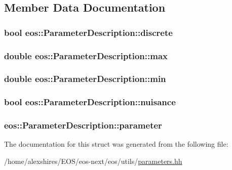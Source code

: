 \subsection{Member Data Documentation}
\hypertarget{structeos_1_1ParameterDescription_a3f62f41ab537a373291807e3b2445c08}{
\subsubsection[{discrete}]{\setlength{\rightskip}{0pt plus 5cm}bool {\bf eos::ParameterDescription::discrete}}}
\label{structeos_1_1ParameterDescription_a3f62f41ab537a373291807e3b2445c08}
\hypertarget{structeos_1_1ParameterDescription_a4375b5ec8b9d496a6183d08f92dc648b}{
\subsubsection[{max}]{\setlength{\rightskip}{0pt plus 5cm}double {\bf eos::ParameterDescription::max}}}
\label{structeos_1_1ParameterDescription_a4375b5ec8b9d496a6183d08f92dc648b}
\hypertarget{structeos_1_1ParameterDescription_abab49c1ed74185718b6d696938d94683}{
\subsubsection[{min}]{\setlength{\rightskip}{0pt plus 5cm}double {\bf eos::ParameterDescription::min}}}
\label{structeos_1_1ParameterDescription_abab49c1ed74185718b6d696938d94683}
\hypertarget{structeos_1_1ParameterDescription_ac9e90def0fd26f7f4f9f59df93f64401}{
\subsubsection[{nuisance}]{\setlength{\rightskip}{0pt plus 5cm}bool {\bf eos::ParameterDescription::nuisance}}}
\label{structeos_1_1ParameterDescription_ac9e90def0fd26f7f4f9f59df93f64401}
\hypertarget{structeos_1_1ParameterDescription_a2d531fff965fd9c1c833213a229c5f10}{
\subsubsection[{parameter}]{ {\bf eos::ParameterDescription::parameter}}}
\label{structeos_1_1ParameterDescription_a2d531fff965fd9c1c833213a229c5f10}


The documentation for this struct was generated from the following file:\begin{DoxyCompactItemize}
\item 
/home/alexshires/EOS/eos-\/next/eos/utils/\hyperlink{parameters_8hh}{parameters.hh}\end{DoxyCompactItemize}

